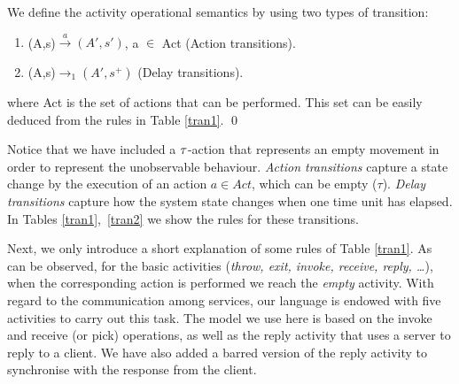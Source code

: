\begin{definition}
We define the activity operational semantics by using two types of transition:

\begin{enumerate}
\item \hspace{0.1cm}(A,s)$\xrightarrow{a}(A',s')$, a $\in$ Act \hspace{0.3cm}(Action transitions).
\item \hspace{0.1cm}(A,s)$\xrightarrow{}_1(A',s^+)$ \hspace{1.45cm}(Delay transitions).
\end{enumerate}

\noindent where Act is the set of actions that can be performed. This set can be easily deduced from the rules in Table \ref{tran1}.
\qed
\end{definition}
Notice that we have included a ${\it \tau}$-action that represents an empty movement in order to represent the unobservable behaviour. \emph{Action transitions} capture a state change by the execution of an action $a \in Act$, which can be empty ($\tau$). \emph{Delay transitions} capture how the system state changes when one time unit has elapsed. In Tables \ref{tran1},\ \ref{tran2} we show the rules for these transitions.

Next, we only introduce a short explanation of some rules
of Table \ref{tran1}. As can be observed, for the basic
activities ({\em throw, exit, invoke, receive, reply, \ldots}), when the
corresponding action is performed we reach the {\it empty} activity. With regard to the communication among
services, our language is endowed with five activities to carry out this task. The model we use here is based on the invoke and
receive (or pick) operations, as well as the reply activity that uses a server to reply to
a client. We have also added a barred version of the reply activity to synchronise with
the response from the client.

